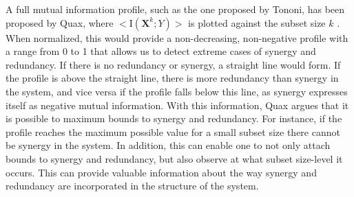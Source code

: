 \documentclass[../main.tex]{subfiles}
\begin{document}
A full mutual information profile, such as the one proposed by Tononi, has been proposed by Quax, where $< \mathrm{I}\left( \mathbf{X}^k;Y \right) >$ is plotted against the subset size $k$ \cite{QuaxPersonal, tononi1999measures}. 
When normalized, this would provide a non-decreasing, non-negative profile with a range from 0 to 1 that allows us to detect extreme cases of synergy and redundancy.
If there is no redundancy or synergy, a straight line would form.
If the profile is above the straight line, there is more redundancy than synergy in the system, and vice versa if the profile falls below this line, as synergy expresses itself as negative mutual information.
With this information, Quax argues that it is possible to maximum bounds to synergy and redundancy.
For instance, if the profile reaches the maximum possible value for a small subset size there cannot be synergy in the system.
In addition, this can enable one to not only attach bounds to synergy and redundancy, but also observe at what subset size-level it occurs.
This can provide valuable information about the way synergy and redundancy are incorporated in the structure of the system.

\end{document}
